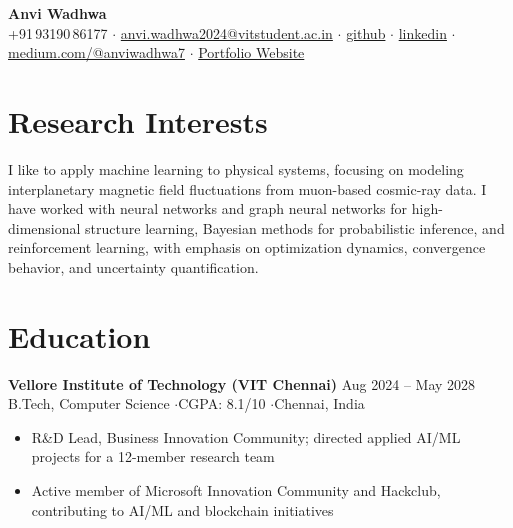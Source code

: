 \documentclass[10pt,letterpaper]{article}
\newcommand{\roleheader}[3]{%
  \textbf{#1} \hfill {\small\color{gray}#2}\\
  {\small\color{gray}#3}
}
\begin{document}

\begin{center}
{\LARGE\bfseries Anvi Wadhwa}\\[3pt]

{\small
+91\,93190\,86177 \;$\cdot$\;
\href{mailto:email@example.com}{anvi.wadhwa2024@vitstudent.ac.in}
\;$\cdot$\;
\href{https://github.com/anvisgit?tab=repositories}{github}
\;$\cdot$\;
\href{https://linkedin.com/in/anviwadhwa7}{linkedin}
\;$\cdot$\;
\href{https://medium.com/@anviwadhwa7}{medium.com/@anviwadhwa7}
\;$\cdot$\;
\href{https://anvisgit.github.io/anvisgit/}{Portfolio Website}
}
\end{center}

\vspace{-4pt}


\section{Research Interests}

{\small
I like to apply machine learning to physical systems, focusing on modeling interplanetary magnetic field fluctuations from muon-based cosmic-ray data. I have worked with neural networks and graph neural networks for high-dimensional structure learning, Bayesian methods for probabilistic inference, and reinforcement learning, with emphasis on optimization dynamics, convergence behavior, and uncertainty quantification.
}


\section{Education}

\roleheader
{Vellore Institute of Technology (VIT Chennai)}
{Aug 2024 -- May 2028}
{B.Tech, Computer Science \quad$\cdot$\quad CGPA: 8.1/10 \quad$\cdot$\quad Chennai, India}

\vspace{1pt}

\begin{itemize}
\item R\&D Lead, Business Innovation Community; directed applied AI/ML projects for a 12-member research team
\item Active member of Microsoft Innovation Community and Hackclub, contributing to AI/ML and blockchain initiatives
\end{itemize}
\end{document}
